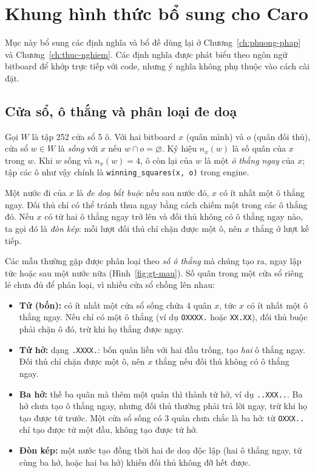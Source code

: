 \section{Khung hình thức bổ sung cho Caro}
\label{sec:lt-khung-caro}
Mục này bổ sung các định nghĩa và bổ đề dùng lại ở Chương~\ref{ch:phuong-phap} và
Chương~\ref{ch:thuc-nghiem}. Các định nghĩa được phát biểu theo ngôn ngữ bitboard để khớp trực
tiếp với code, nhưng ý nghĩa không phụ thuộc vào cách cài đặt.

\subsection{Cửa sổ, ô thắng và phân loại đe doạ}
\label{sec:lt-de-doa}
Gọi $W$ là tập 252 cửa sổ 5 ô. Với hai bitboard $x$ (quân mình) và $o$ (quân đối thủ), cửa sổ
$w \in W$ là \emph{sống} với $x$ nếu $w \cap o = \varnothing$. Ký hiệu $n_x(w)$ là số quân của
$x$ trong $w$. Khi $w$ sống và $n_x(w)=4$, ô còn lại của $w$ là một \emph{ô thắng ngay} của $x$;
tập các ô như vậy chính là \texttt{winning\_squares(x, o)} trong engine.

\begin{dinhnghia}
\label{dn:de-doa}
Một nước đi của $x$ là \emph{đe doạ bắt buộc} nếu sau nước đó, $x$ có ít nhất một ô thắng ngay.
Đối thủ chỉ có thể tránh thua ngay bằng cách chiếm một trong các ô thắng đó. Nếu $x$ có từ hai
ô thắng ngay trở lên và đối thủ không có ô thắng ngay nào, ta gọi đó là \emph{đòn kép}: mỗi
lượt đối thủ chỉ chặn được một ô, nên $x$ thắng ở lượt kế tiếp.
\end{dinhnghia}

Các mẫu thường gặp được phân loại theo \emph{số ô thắng} mà chúng tạo ra, ngay lập tức hoặc sau
một nước nữa (Hình~\ref{fig:gt-mau}). Số quân trong một cửa sổ riêng lẻ chưa đủ để phân loại, vì
nhiều cửa sổ chồng lên nhau:
\begin{itemize}
  \item \textbf{Tứ (bốn):} có ít nhất một cửa sổ sống chứa 4 quân $x$, tức $x$ có ít nhất một ô
        thắng ngay. Nếu chỉ có một ô thắng (ví dụ \texttt{OXXXX.} hoặc \texttt{XX.XX}), đối thủ buộc
        phải chặn ô đó, trừ khi họ thắng được ngay.
  \item \textbf{Tứ hở:} dạng \texttt{.XXXX.}: bốn quân liền với hai đầu trống, tạo \emph{hai} ô thắng
        ngay. Đối thủ chỉ chặn được một ô, nên $x$ thắng nếu đối thủ không có ô thắng ngay.
  \item \textbf{Ba hở:} thế ba quân mà thêm một quân thì thành tứ hở, ví dụ \texttt{..XXX..}. Ba hở
        chưa tạo ô thắng ngay, nhưng đối thủ thường phải trả lời ngay, trừ khi họ tạo được tứ
        trước. Một cửa sổ sống có 3 quân chưa chắc là ba hở: từ \texttt{OXXX..} chỉ tạo được tứ một
        đầu, không tạo được tứ hở.
  \item \textbf{Đòn kép:} một nước tạo đồng thời hai đe doạ độc lập (hai ô thắng ngay, tứ cùng ba
        hở, hoặc hai ba hở) khiến đối thủ không đỡ hết được.
\end{itemize}

